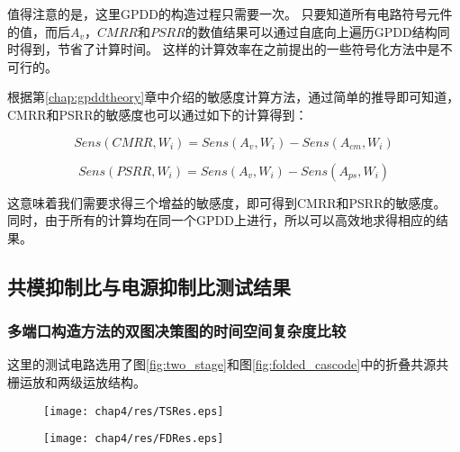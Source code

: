 值得注意的是，这里GPDD的构造过程只需要一次。
只要知道所有电路符号元件的值，而后$A_v$，$CMRR$和$PSRR$的数值结果可以通过自底向上遍历GPDD结构同时得到，节省了计算时间。
这样的计算效率在之前提出的一些符号化方法中是不可行的\parencite{Gielen-ISAAC-1989}。

根据第\ref{chap:gpddtheory}章中介绍的敏感度计算方法，通过简单的推导即可知道，CMRR和PSRR的敏感度也可以通过如下的计算得到：

\begin{equation}
Sens\left( {{CMRR},{W_i}} \right) = Sens\left( {{A_{v}},{W_i}} \right) - Sens\left( {{A_{cm}},{W_i}} \right)
\end{equation}

\begin{equation}
Sens\left( {{PSRR},{W_i}} \right) = Sens\left( {{A_{v}},{W_i}} \right) - Sens\left( {{A_{ps}},{W_i}} \right)
\end{equation}

这意味着我们需要求得三个增益的敏感度，即可得到CMRR和PSRR的敏感度。
同时，由于所有的计算均在同一个GPDD上进行，所以可以高效地求得相应的结果。

\subsection{共模抑制比与电源抑制比测试结果}

\subsubsection{多端口构造方法的双图决策图的时间空间复杂度比较}

这里的测试电路选用了图\ref{fig:two_stage}和图\ref{fig:folded_cascode}中的折叠共源共栅运放和两级运放结构。

\begin{figure}[!htp]
	\centering
	\texttt{[image: chap4/res/TSRes.eps]}
\end{figure}

\begin{figure}[!htp]
	\centering
	\texttt{[image: chap4/res/FDRes.eps]}
\end{figure}

